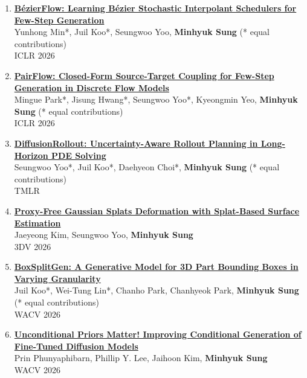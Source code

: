 \documentclass[letterpaper,10pt]{article} %
\newcommand{\blankline}{\quad\pagebreak[2]}
\begin{document}
\begin{enumerate}
\item \label{iclr26_2}
\href{https://arxiv.org/abs/2512.13255}{\textbf{B\'ezierFlow: Learning B\'ezier Stochastic Interpolant Schedulers for Few-Step Generation}}\\
Yunhong Min*, Juil Koo*, Seungwoo Yoo, \textbf{Minhyuk Sung} (* equal contributions)\\
ICLR 2026\\
\blankline

\item \label{iclr26_1}
\href{https://arxiv.org/abs/2512.20063}{\textbf{PairFlow: Closed-Form Source-Target Coupling for Few-Step Generation in Discrete Flow Models}}\\
Mingue Park*, Jisung Hwang*, Seungwoo Yoo*, Kyeongmin Yeo, \textbf{Minhyuk Sung} (* equal contributions)\\
ICLR 2026\\
\blankline

\item \label{tmlr26}
\href{https://arxiv.org/abs/2602.13616}{\textbf{DiffusionRollout: Uncertainty-Aware Rollout Planning in Long-Horizon PDE Solving}}\\
Seungwoo Yoo*, Juil Koo*, Daehyeon Choi*, \textbf{Minhyuk Sung} (* equal contributions)\\
TMLR\\
\blankline

\item \label{3dv26}
\href{https://arxiv.org/abs/2511.19542}{\textbf{Proxy-Free Gaussian Splats Deformation with Splat-Based Surface Estimation}}\\
Jaeyeong Kim, Seungwoo Yoo, \textbf{Minhyuk Sung}\\
3DV 2026\\
\blankline

\item \label{wacv26_2}
\href{https://arxiv.org/abs/2602.20666}{\textbf{BoxSplitGen: A Generative Model for 3D Part Bounding Boxes in Varying Granularity}}\\
Juil Koo*, Wei-Tung Lin*, Chanho Park, Chanhyeok Park, \textbf{Minhyuk Sung} (* equal contributions)\\
WACV 2026\\
\blankline

\item \label{wacv26_1}
\href{https://arxiv.org/abs/2503.20240}{\textbf{Unconditional Priors Matter! Improving Conditional Generation of Fine-Tuned Diffusion Models}}\\
Prin Phunyaphibarn, Phillip Y. Lee, Jaihoon Kim, \textbf{Minhyuk Sung}\\
WACV 2026\\
\blankline


\end{enumerate}
\end{document}
